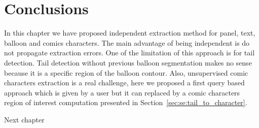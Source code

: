 
\section{Conclusions}
\label{sec:in:conclusion}

In this chapter we have proposed independent extraction method for panel, text, balloon and comics characters.
The main advantage of being independent is do not propagate extraction errors.
One of the limitation of this approach is for tail detection.
Tail detection without previous balloon segmentation makes no sense because it is a specific region of the balloon contour.
Also, unsupervised comic characters extraction is a real challenge, here we proposed a first query based approach which is given by a user but it can replaced by a comic characters region of interest computation presented in Section~\ref{sec:se:tail_to_character}.

Next chapter 


